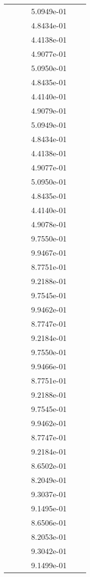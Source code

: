 \begin{xltabular}{\textwidth}{r|rS[table-format=1.3e+2]S[table-format=1.4e+2]S[table-format=1.4e+2]S[table-format=-1.5]}
&  &  & 5.0949e-01 & & \\
&  &  & 4.8434e-01 & & \\
&  &  & 4.4138e-01 & & \\
&  &  & 4.9077e-01 & & \\
&  &  & 5.0950e-01 & & \\
&  &  & 4.8435e-01 & & \\
&  &  & 4.4140e-01 & & \\
&  &  & 4.9079e-01 & & \\
&  &  & 5.0949e-01 & & \\
&  &  & 4.8434e-01 & & \\
&  &  & 4.4138e-01 & & \\
&  &  & 4.9077e-01 & & \\
&  &  & 5.0950e-01 & & \\
&  &  & 4.8435e-01 & & \\
&  &  & 4.4140e-01 & & \\
&  &  & 4.9078e-01 & & \\
&  &  & 9.7550e-01 & & \\
&  &  & 9.9467e-01 & & \\
&  &  & 8.7751e-01 & & \\
&  &  & 9.2188e-01 & & \\
&  &  & 9.7545e-01 & & \\
&  &  & 9.9462e-01 & & \\
&  &  & 8.7747e-01 & & \\
&  &  & 9.2184e-01 & & \\
&  &  & 9.7550e-01 & & \\
&  &  & 9.9466e-01 & & \\
&  &  & 8.7751e-01 & & \\
&  &  & 9.2188e-01 & & \\
&  &  & 9.7545e-01 & & \\
&  &  & 9.9462e-01 & & \\
&  &  & 8.7747e-01 & & \\
&  &  & 9.2184e-01 & & \\
&  &  & 8.6502e-01 & & \\
&  &  & 8.2049e-01 & & \\
&  &  & 9.3037e-01 & & \\
&  &  & 9.1495e-01 & & \\
&  &  & 8.6506e-01 & & \\
&  &  & 8.2053e-01 & & \\
&  &  & 9.3042e-01 & & \\
&  &  & 9.1499e-01 & & \\

\end{xltabular}
